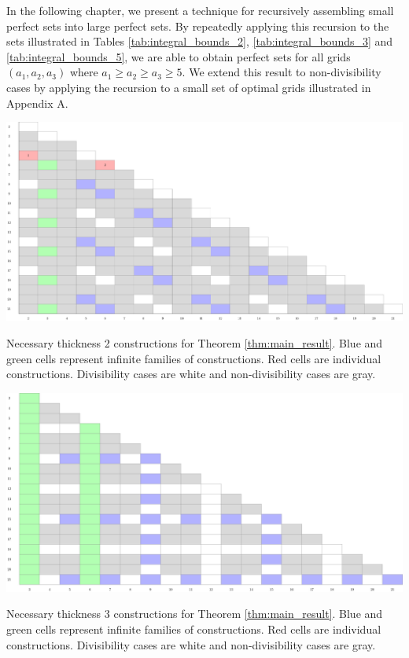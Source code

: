 In the following chapter, we present a technique for recursively assembling small perfect sets into large perfect sets. By repeatedly applying this recursion to the sets illustrated in Tables \ref{tab:integral_bounds_2}, \ref{tab:integral_bounds_3} and \ref{tab:integral_bounds_5}, we are able to obtain perfect sets for all grids $(a_1, a_2, a_3)$ where $a_1 \geq a_2 \geq a_3 \geq 5$. We extend this result to non-divisibility cases by applying the recursion to a small set of optimal grids illustrated in Appendix A. 

\begin{table}[]
\centering
\includegraphics[width=\textwidth]{tables/2/thickness_2.pdf}
\caption{Necessary thickness 2 constructions for Theorem \ref{thm:main_result}. Blue and green cells represent infinite families of constructions. Red cells are individual constructions. Divisibility cases are white and non-divisibility cases are gray.}
\label{tab:integral_bounds_2}
\end{table} 

\begin{table}[]
\centering
\includegraphics[width=\textwidth]{tables/2/thickness_3.pdf}
\caption{Necessary thickness 3 constructions for Theorem \ref{thm:main_result}. Blue and green cells represent infinite families of constructions. Red cells are individual constructions. Divisibility cases are white and non-divisibility cases are gray.}
\label{tab:integral_bounds_3}
\end{table} 

